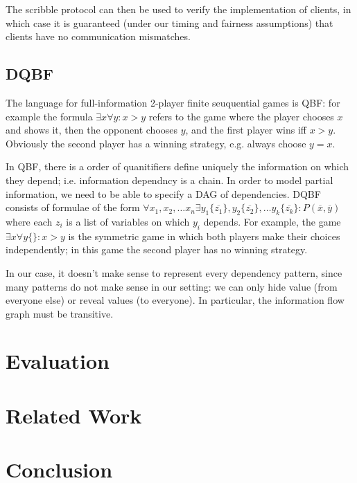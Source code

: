 \documentclass[acmsmall,review,anonymous]{acmart}\settopmatter{printfolios=true,printccs=false,printacmref=false}
\begin{document}
The scribble protocol can then be used to verify the implementation of clients, in which case it is guaranteed (under our timing and fairness assumptions) that clients have no communication mismatches.

\subsection{DQBF}
The language for full-information 2-player finite seuquential games is QBF: for example the formula $\exists x \forall y: x > y$ refers to the game where the player chooses $x$ and shows it, then the opponent chooses $y$, and the first player wins iff $x > y$. Obviously the second player has a winning strategy, e.g. always choose $y=x$.

In QBF, there is a order of quanitifiers define uniquely the information on which they depend; i.e. information dependncy is a chain. In order to model partial information, we need to be able to specify a DAG of dependencies. DQBF consists of formulae of the form $\forall x_1, x_2, \ldots x_n \exists y_1 \{\overline{z_1}\}, y_2 \{\overline{z_2}\}, \ldots y_k \{\overline{z_k}\}: P(\overline{x}, \overline{y})$ where each $z_i$ is a list of variables on which $y_i$ depends. For example, the game $\exists x \forall y\{\}: x > y$ is the symmetric game in which both players make their choices independently; in this game the second player has no winning strategy.

In our case, it doesn't make sense to represent every dependency pattern, since many patterns do not make sense in our setting: we can only hide value (from everyone else) or reveal values (to everyone). In particular, the information flow graph must be transitive.

\section{Evaluation}

\section{Related Work}

\section{Conclusion}
\end{document}
